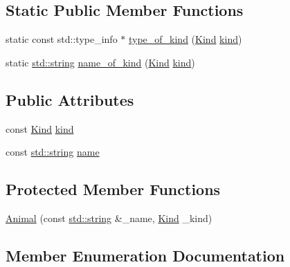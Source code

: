 \subsection*{Static Public Member Functions}
\begin{DoxyCompactItemize}
\item 
static const std\+::type\+\_\+info $\ast$ \mbox{\hyperlink{struct_animal_aabe01c9a2ed53acd395e9cd699259814}{type\+\_\+of\+\_\+kind}} (\mbox{\hyperlink{struct_animal_abd6bed3bf6361cc3dc37c03f297e3f48}{Kind}} \mbox{\hyperlink{struct_animal_afd764a2f40502e0417c8691f7137ac3a}{kind}})
\item 
static \mbox{\hyperlink{_s_d_l__opengl__glext_8h_ab4ccfaa8ab0e1afaae94dc96ef52dde1}{std\+::string}} \mbox{\hyperlink{struct_animal_a2e88b21d676b809b69a8e2adf6d6e52e}{name\+\_\+of\+\_\+kind}} (\mbox{\hyperlink{struct_animal_abd6bed3bf6361cc3dc37c03f297e3f48}{Kind}} \mbox{\hyperlink{struct_animal_afd764a2f40502e0417c8691f7137ac3a}{kind}})
\end{DoxyCompactItemize}
\subsection*{Public Attributes}
\begin{DoxyCompactItemize}
\item 
const \mbox{\hyperlink{struct_animal_abd6bed3bf6361cc3dc37c03f297e3f48}{Kind}} \mbox{\hyperlink{struct_animal_afd764a2f40502e0417c8691f7137ac3a}{kind}}
\item 
const \mbox{\hyperlink{_s_d_l__opengl__glext_8h_ab4ccfaa8ab0e1afaae94dc96ef52dde1}{std\+::string}} \mbox{\hyperlink{struct_animal_a3415d6574598b7a36266e027c7b28b7d}{name}}
\end{DoxyCompactItemize}
\subsection*{Protected Member Functions}
\begin{DoxyCompactItemize}
\item 
\mbox{\hyperlink{struct_animal_af163de0cc8414e7f3ae8a18c848c42cc}{Animal}} (const \mbox{\hyperlink{_s_d_l__opengl__glext_8h_ab4ccfaa8ab0e1afaae94dc96ef52dde1}{std\+::string}} \&\+\_\+name, \mbox{\hyperlink{struct_animal_abd6bed3bf6361cc3dc37c03f297e3f48}{Kind}} \+\_\+kind)
\end{DoxyCompactItemize}


\subsection{Member Enumeration Documentation}
\mbox{\label{struct_animal_abd6bed3bf6361cc3dc37c03f297e3f48}} 
